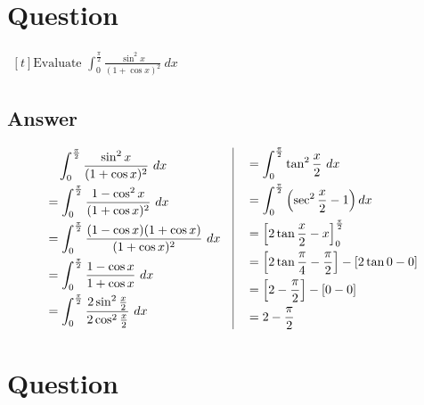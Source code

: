 \documentclass[17pt]{extarticle}
\begin{document}
\noindent
\begin{fleqn} 


\section{Question} 

$\begin{aligned}[t] 
\text{Evaluate \ } \int_{0}^{\frac{\pi}{2}} \frac{\sin^2x}{(1 + \cos x)^2}\ dx
\end{aligned}$

\subsection*{Answer}
\begin{equation} \nonumber
\begin{alignedat}{4}
& \quad  \int_{0}^{\frac{\pi}{2}} \frac{\sin^2x}{(1 + \cos x)^2}\ dx\\
&= \int_{0}^{\frac{\pi}{2}} \frac{1 -\cos^2x}{(1 + \cos x)^2}\ dx\\
&= \int_{0}^{\frac{\pi}{2}} \frac{(1 -\cos x)(1 +\cos x)}{(1 + \cos x)^2}\ dx\\
&= \int_{0}^{\frac{\pi}{2}} \frac{1 -\cos x}{1 + \cos x}\ dx\\
&= \int_{0}^{\frac{\pi}{2}} \frac{2\sin^2\frac{x}{2}}{2\cos^2\frac{x}{2}}\ dx\\
\end{alignedat}
\quad
\vrule
\quad
\begin{alignedat}{4}
&= \int_{0}^{\frac{\pi}{2}} \tan^2\frac{x}{2}\ dx\\
&= \int_{0}^{\frac{\pi}{2}} \left(\sec^2\frac{x}{2}-1\right)dx\\
&= \left[2\tan\frac{x}{2}-x\right]_{0}^{\frac{\pi}{2}}\\
&= \left[2\tan\frac{\pi}{4}-\frac{\pi}{2}\right]-\left[2\tan 0 - 0 \right]\\
&= \left[2 -\frac{\pi}{2}\right]-\left[0 - 0 \right]\\
&= 2 -\frac{\pi}{2}
\end{alignedat}
\end{equation}

\section{Question} 


\end{fleqn}
\end{document}
